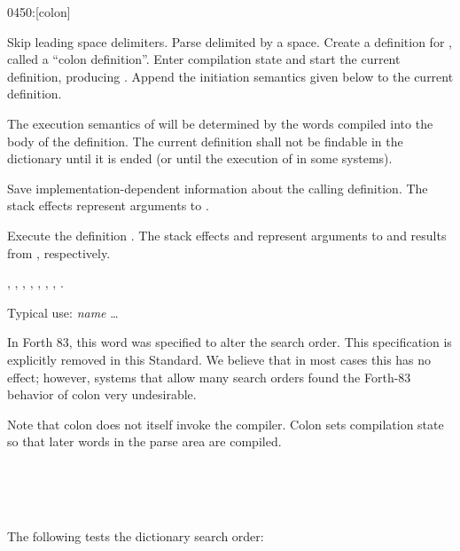 \begin{worddef}{0450}{:}[colon]
\item {}

	Skip leading space delimiters. Parse  delimited by a
	space. Create a definition for , called a ``colon
	definition''. Enter compilation state and start the current
	definition, producing . Append the initiation
	semantics given below to the current definition.

	The execution semantics of  will be determined by the
	words compiled into the body of the definition. The current
	definition shall not be findable in the dictionary until it is
	ended (or until the execution of  in some systems).

\init {}

	Save implementation-dependent information 
	about the calling definition. The stack effects 
	represent arguments to .

\execute[name]

	Execute the definition . The stack effects
	 and  represent arguments to and
	results from , respectively.

\see {},
	,
	,
	,
	\wref{core:[}{[},
	\wref{core:]}{]},
	,
	.

	\begin{rationale} %
		Typical use:
			\word{:} \emph{name} {\ldots} \word{;}

		In Forth 83, this word was specified to alter the search order.
		This specification is explicitly removed in this Standard. We
		believe that in most cases this has no effect; however, systems
		that allow many search orders found the Forth-83 behavior of
		colon very undesirable.

		Note that colon does not itself invoke the compiler. Colon sets
		compilation state so that later words in the parse area are
		compiled.
	\end{rationale}

	\begin{testing} %
		 \\
		 \\
		 \\

		The following tests the dictionary search order:

		 \\
	\end{testing}
\end{worddef}



